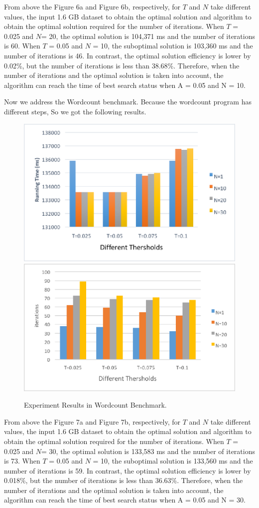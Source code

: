 \par From above the Figure 6a and Figure 6b, respectively, for $T$ and $N$ take different values, the input 1.6 GB dataset to obtain the optimal solution and algorithm to obtain the optimal solution required for the number of iterations. When $T$ = 0.025 and $N$= 20, the optimal solution is 104,371 ms and the number of iterations is 60. When $T$ = 0.05 and $N$ = 10, the suboptimal solution is 103,360 ms and the number of iterations is 46. In contrast, the optimal solution efficiency is lower by 0.02\%, but the number of iterations is less than 38.68\%. Therefore, when the number of iterations and the optimal solution is taken into account, the algorithm can reach the time of best search status when A = 0.05 and N = 10. 
\par Now we address the Wordcount benchmark. Because the wordcount program has different steps, So we got the following results.
\begin{figure}[!htbp]
	\centering
	{\includegraphics[width=0.48\linewidth]{wordcountRunningTime.eps}}
	{\includegraphics[width=0.48\linewidth]{wordcountIterations.eps}}\\
	\centering
	\caption{Experiment Results in Wordcount Benchmark.}
	\vspace{5mm}
	\label{fig:wordcountcompare}
\end{figure}
\par From above the Figure 7a and Figure 7b, respectively, for $T$ and $N$ take different values, the input 1.6 GB dataset to obtain the optimal solution and algorithm to obtain the optimal solution required for the number of iterations. When $T$ = 0.025 and $N$= 30, the optimal solution is 133,583 ms and the number of iterations is 73. When $T$ = 0.05 and $N$ = 10, the suboptimal solution is 133,560 ms and the number of iterations is 59. In contrast, the optimal solution efficiency is lower by 0.018\%, but the number of iterations is less than 36.63\%. Therefore, when the number of iterations and the optimal solution is taken into account, the algorithm can reach the time of best search status when A = 0.05 and N = 30.
